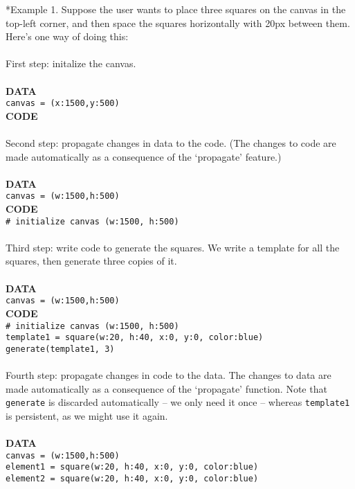 \documentclass[12pt]{article}
\theoremstyle{remark}
\newcommand{\ttt}[1]{\texttt{#1}}
\begin{document}
\begin{section}*{Example 1.} Suppose the user wants to place three squares on the canvas in the top-left corner, and then space the squares horizontally with 20px between them. Here's one way of doing this:\\\\
First step: initalize the canvas.\\\\
\textbf{DATA}\\
\ttt{canvas = (x:1500,y:500)}
\\
\textbf{CODE}\\
\\
Second step: propagate changes in data to the code. (The changes to code are made automatically as a consequence of the `propagate' feature.)
\\\\
\textbf{DATA}\\
\ttt{canvas = (w:1500,h:500)}
\\
\textbf{CODE}\\
\ttt{\# initialize canvas (w:1500, h:500)}
\\\\
Third step: write code to generate the squares. We write a template for all the squares, then generate three copies of it.
\\\\
\textbf{DATA}\\
\ttt{canvas = (w:1500,h:500)}
\\
\textbf{CODE}\\
\ttt{\# initialize canvas (w:1500, h:500)}\\
\ttt{template1 = square(w:20, h:40, x:0, y:0, color:blue)}\\
\ttt{generate(template1, 3)}
\\\\
Fourth step: propagate changes in code to the data. The changes to data are made automatically as a consequence of the `propagate' function. Note that \ttt{generate} is discarded automatically -- we only need it once -- whereas \ttt{template1} is persistent, as we might use it again.
\\\\
\textbf{DATA}\\
\ttt{canvas = (w:1500,h:500)}
\\
\ttt{element1 = square(w:20, h:40, x:0, y:0, color:blue)}
\\
\ttt{element2 = square(w:20, h:40, x:0, y:0, color:blue)}\\

\end{section}
\end{document}
